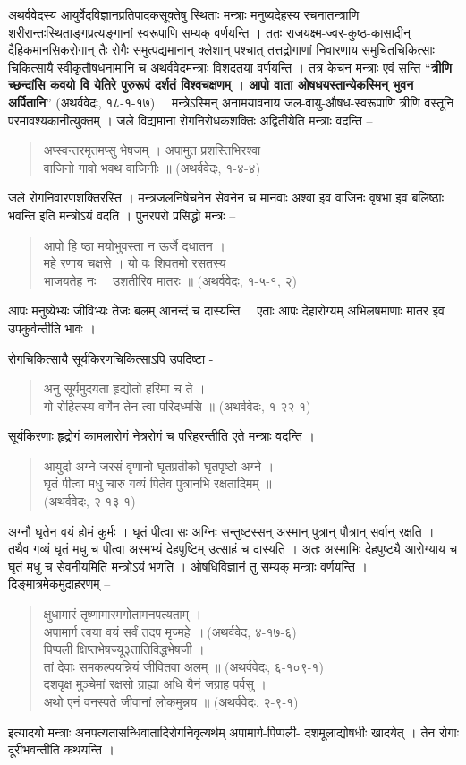 अथर्ववेदस्य आयुर्वेदविज्ञानप्रतिपादकसूक्तेषु स्थिताः मन्त्राः मनुष्यदेहस्य रचनातन्त्राणि शरीरान्तःस्थिताङ्गप्रत्यङ्गानां स्वरूपाणि सम्यक् वर्णयन्ति । ततः राजयक्ष्म-ज्वर-कुष्ठ-कासादीन् दैहिकमानसिकरोगान् तैः रोगैः समुत्पद्यमानान् क्लेशान् पश्चात् तत्तद्रोगाणां निवारणाय समुचितचिकित्साः चिकित्सायै स्वीकृतौषधनामानि च अथर्ववेदमन्त्राः विशदतया वर्णयन्ति । तत्र केचन मन्त्राः एवं सन्ति “\textbf{त्रीणि च्छन्दांसि कवयो वि येतिरे पुरुरूपं दर्शतं विश्वचक्षणम् । आपो वाता ओषधयस्तान्येकस्मिन् भुवन अर्पितानि}” (अथर्ववेदः, १८-१-१७) । मन्त्रेऽस्मिन् अनामयावनाय जल-वायु-औषध-स्वरूपाणि त्रीणि वस्तूनि परमावश्यकानीत्युक्तम् । जले विद्यमाना रोगनिरोधकशक्तिः अद्वितीयेति मन्त्राः वदन्ति –
\begin{verse}
अप्स्वन्तरमृतमप्सु भेषजम् । अपामुत प्रशस्तिभिरश्वा\\
वाजिनो गावो भवथ वाजिनीः ॥ (अथर्ववेदः, १-४-४)
\end{verse}
जले रोगनिवारणशक्तिरस्ति । मन्त्रजलनिषेचनेन सेवनेन च मानवाः अश्वा इव वाजिनः वृषभा इव बलिष्ठाः भवन्ति इति मन्त्रोऽयं वदति । पुनरपरो प्रसिद्धो मन्त्रः –
\begin{verse}
आपो हि ष्ठा मयोभुवस्ता न ऊर्जे दधातन ।\\
महे रणाय चक्षसे । यो वः शिवतमो रसतस्य\\
भाजयतेह नः । उशतीरिव मातरः ॥ (अथर्ववेदः, १-५-१, २)
\end{verse}
आपः मनुष्येभ्यः जीविभ्यः तेजः बलम् आनन्दं च दास्यन्ति । एताः आपः देहारोग्यम् अभिलषमाणाः मातर इव उपकुर्वन्तीति भावः ।

रोगचिकित्सायै सूर्यकिरणचिकित्साऽपि उपदिष्टा -
\begin{verse}
अनु सूर्यमुदयता हृद्योतो हरिमा च ते ।\\
गो रोहितस्य वर्णेन तेन त्वा परिदध्मसि ॥ (अथर्ववेदः, १-२२-१)
\end{verse}
सूर्यकिरणाः हृद्रोगं कामलारोगं नेत्ररोगं च परिहरन्तीति एते मन्त्राः वदन्ति ।
\begin{verse}
आयुर्दा अग्ने जरसं वृणानो घृतप्रतीको घृतपृष्ठो अग्ने ।\\
घृतं पीत्वा मधु चारु गव्यं पितेव पुत्रानभि रक्षतादिमम् ॥\\
\hfill(अथर्ववेदः, २-१३-१)
\end{verse}
अग्नौ घृतेन वयं होमं कुर्मः । घृतं पीत्वा सः अग्निः सन्तुष्टस्सन् अस्मान् पुत्रान् पौत्रान् सर्वान् रक्षति । तथैव गव्यं घृतं मधु च पीत्वा अस्मभ्यं देहपुष्टिम् उत्साहं च दास्यति । अतः अस्माभिः देहपुष्ट्यै आरोग्याय च घृतं मधु च सेवनीयमिति मन्त्रोऽयं भणति । ओषधिविज्ञानं तु सम्यक् मन्त्राः वर्णयन्ति । दिङ्मात्रमेकमुदाहरणम् –
\begin{verse}
क्षुधामारं तृष्णामारमगोतामनपत्यताम् ।\\
अपामार्ग त्वया वयं सर्वं तदप मृज्महे ॥ (अथर्ववेद, ४-१७-६)\\
पिप्पली क्षिप्तभेषज्यू३तातिविद्धभेषजी ।\\
तां देवाः समकल्पयन्नियं जीवितवा अलम् ॥ (अथर्ववेदः, ६-१०९-१)\\
दशवृक्ष मुञ्चेमां रक्षसो ग्राह्या अधि यैनं जग्राह पर्वसु ।\\
अथो एनं वनस्पते जीवानां लोकमुन्नय ॥ (अथर्ववेदः, २-९-१)
\end{verse}
इत्यादयो मन्त्राः अनपत्यतासन्धिवातादिरोगनिवृत्यर्थम् अपामार्ग-पिप्पली- दशमूलाद्योषधीः खादयेत् । तेन रोगाः दूरीभवन्तीति कथयन्ति ।

